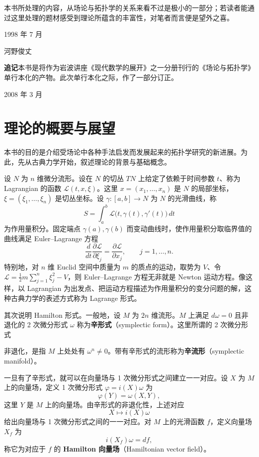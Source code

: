 本书所处理的内容，从场论与拓扑学的关系来看不过是极小的一部分；若读者能通过这里处理的题材感受到理论所蕴含的丰富性，对笔者而言便是望外之喜。

\medskip
\hspace*{2em}1998 年 7 月

\hspace*{2em}河野俊丈

\bigskip
\noindent\textbf{追记}\quad 本书是将作为岩波讲座《现代数学的展开》之一分册刊行的《场论与拓扑学》单行本化的产物。此次单行本化之际，作了一部分订正。

\medskip
\hspace*{2em}2008 年 3 月

\chapter*{理论的概要与展望}

本书的目的是介绍受场论中各种手法启发而发展起来的拓扑学研究的新进展。为此，先从古典力学开始，叙述理论的背景与基础概念。

设 $N$ 为 $n$ 维微分流形。设在 $N$ 的切丛 $TN$ 上给定了依赖于时间参数 $t$、称为 Lagrangian 的函数 $\mathcal{L}(t,x,\xi)$。这里 $x=(x_1,\dots,x_n)$ 是 $N$ 的局部坐标，$\xi=(\xi_1,\dots,\xi_n)$ 是切丛坐标。设 $\gamma\colon[a,b]\to N$ 为 $N$ 的光滑曲线，称
\[
  S=\int_a^b \mathcal{L}\bigl(t,\gamma(t),\gamma'(t)\bigr)\,dt
\]
为作用量积分。固定端点 $\gamma(a),\gamma(b)$ 而变动曲线时，使作用量积分取临界值的曲线满足 Euler--Lagrange 方程
\[
  \frac{d}{dt}\frac{\partial \mathcal{L}}{\partial \xi_j}
  =\frac{\partial \mathcal{L}}{\partial x_j},\qquad j=1,\dots,n .
\]
特别地，对 $n$ 维 Euclid 空间中质量为 $m$ 的质点的运动，取势为 $V$、令
$\mathcal{L}=\frac{1}{2}m\sum_{j=1}^{n}\xi_j^{2}-V$，则 Euler--Lagrange 方程无非就是 Newton 运动方程。像这样，以 Lagrangian 为出发点、把运动方程描述为作用量积分的变分问题的解，这种古典力学的表述方式称为 Lagrange 形式。

其次说明 Hamilton 形式。一般地，设 $M$ 为 $2n$ 维流形。$M$ 上满足 $d\omega=0$ 且非退化的 2 次微分形式 $\omega$ 称为\textbf{辛形式}（symplectic form）。这里所谓的 2 次微分形式

非退化，是指 $M$ 上处处有 $\omega^{n}\neq 0$。带有辛形式的流形称为\textbf{辛流形}（symplectic manifold）。

一旦有了辛形式，就可以在向量场与 1 次微分形式之间建立一一对应。设 $X$ 为 $M$ 上的向量场，定义 1 次微分形式 $\varphi=i(X)\omega$ 为
\[
  \varphi(Y)=\omega(X,Y),
\]
这里 $Y$ 是 $M$ 上的向量场。由辛形式的非退化性，上述对应
\[
  X\longmapsto i(X)\omega
\]
给出向量场与 1 次微分形式之间的一一对应。对 $M$ 上的光滑函数 $f$，定义向量场 $X_f$ 为
\[
  i(X_f)\omega=df,
\]
称它为对应于 $f$ 的 \textbf{Hamilton 向量场}（Hamiltonian vector field）。

